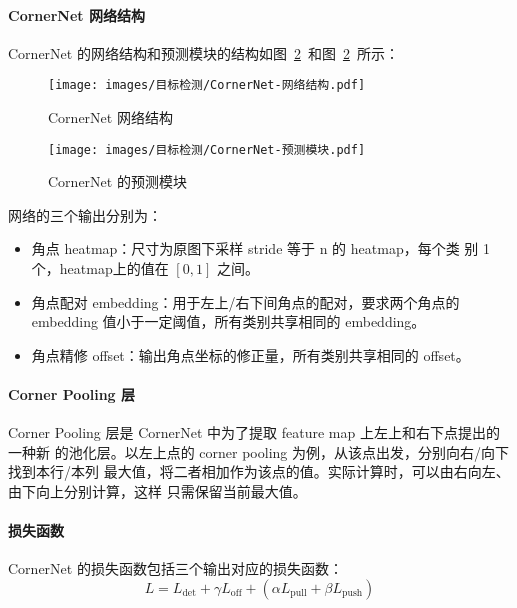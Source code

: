 \paragraph{CornerNet 网络结构}
CornerNet 的网络结构和预测模块的结构如图~\ref{fig:CornerNet-network}~和图~\ref{fig:CornerNet-network}~所示：

\begin{figure}[ht]
  \centering
  \texttt{[image: images/目标检测/CornerNet-网络结构.pdf]}
  \caption{CornerNet 网络结构}
  \label{fig:CornerNet-network}
\end{figure}

\begin{figure}[ht]
  \centering
  \texttt{[image: images/目标检测/CornerNet-预测模块.pdf]}
  \caption{CornerNet 的预测模块}
  \label{fig:CornerNet-network}
\end{figure}

网络的三个输出分别为：

\begin{itemize}
  \item 角点 heatmap：尺寸为原图下采样 stride 等于 n 的 heatmap，每个类
    别 1 个，heatmap上的值在 $[0, 1]$ 之间。
  \item 角点配对 embedding：用于左上/右下间角点的配对，要求两个角点的 embedding
    值小于一定阈值，所有类别共享相同的 embedding。
  \item 角点精修 offset：输出角点坐标的修正量，所有类别共享相同的 offset。
\end{itemize}

\paragraph{Corner Pooling 层}
Corner Pooling 层是 CornerNet 中为了提取 feature map 上左上和右下点提出的一种新
的池化层。以左上点的 corner pooling 为例，从该点出发，分别向右/向下找到本行/本列
最大值，将二者相加作为该点的值。实际计算时，可以由右向左、由下向上分别计算，这样
只需保留当前最大值。

\paragraph{损失函数}
CornerNet 的损失函数包括三个输出对应的损失函数：
\begin{equation}
  \label{eq:cornernet-loss}
  L = L_{\mathrm{det}} + \gamma L_{\mathrm{off}} + (\alpha L_{\mathrm{pull}} + \beta L_{\mathrm{push}})
\end{equation}


